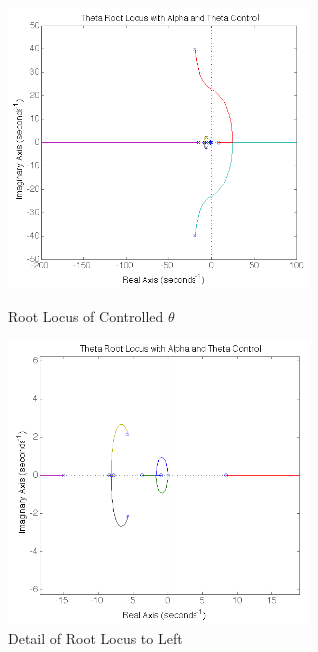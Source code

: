 \documentclass{article}
\theoremstyle{plain}
\theoremstyle{definition}
\theoremstyle{remark}
\begin{document}
\begin{figure}
\begin{minipage}[b]{0.45\linewidth}
\includegraphics[width = 8cm]{controlledTheta.png}
\caption{Root Locus of Controlled $\theta$}
\label{q8controlledTheta}
\end{minipage}
\hspace{0.5cm}
\begin{minipage}[b]{0.45\linewidth}
\includegraphics[width = 8cm]{controlledThetaDetail.png}
\caption{Detail of Root Locus to Left}
\label{q8controlledThetaDetail}
\end{minipage}
\end{figure}
\end{document}

